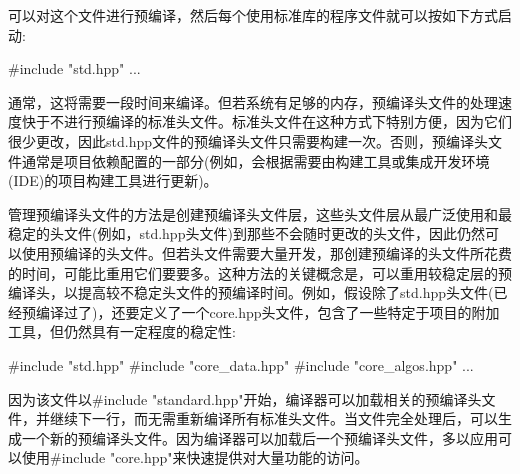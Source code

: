 可以对这个文件进行预编译，然后每个使用标准库的程序文件就可以按如下方式启动:

\begin{cpp}
#include "std.hpp"
...
\end{cpp}

通常，这将需要一段时间来编译。但若系统有足够的内存，预编译头文件的处理速度快于不进行预编译的标准头文件。标准头文件在这种方式下特别方便，因为它们很少更改，因此std.hpp文件的预编译头文件只需要构建一次。否则，预编译头文件通常是项目依赖配置的一部分(例如，会根据需要由构建工具或集成开发环境(IDE)的项目构建工具进行更新)。

管理预编译头文件的方法是创建预编译头文件层，这些头文件层从最广泛使用和最稳定的头文件(例如，std.hpp头文件)到那些不会随时更改的头文件，因此仍然可以使用预编译的头文件。但若头文件需要大量开发，那创建预编译的头文件所花费的时间，可能比重用它们要要多。这种方法的关键概念是，可以重用较稳定层的预编译头，以提高较不稳定头文件的预编译时间。例如，假设除了std.hpp头文件(已经预编译过了)，还要定义了一个core.hpp头文件，包含了一些特定于项目的附加工具，但仍然具有一定程度的稳定性:

\begin{cpp}
#include "std.hpp"
#include "core_data.hpp"
#include "core_algos.hpp"
...
\end{cpp}

因为该文件以\#include "standard.hpp"开始，编译器可以加载相关的预编译头文件，并继续下一行，而无需重新编译所有标准头文件。当文件完全处理后，可以生成一个新的预编译头文件。因为编译器可以加载后一个预编译头文件，多以应用可以使用\#include "core.hpp"来快速提供对大量功能的访问。























